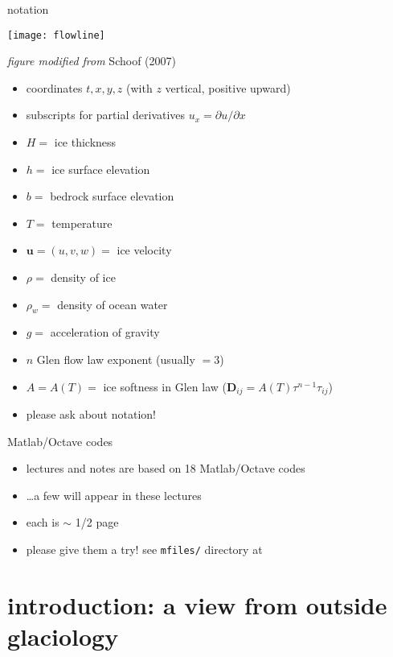 \begin{frame}{notation} 

\begin{center}
  \texttt{[image: flowline]}

\tiny \emph{figure modified from} Schoof (2007)
\end{center}

\scriptsize
  \begin{itemize}
  \item coordinates $t,x,y,z$  (with $z$ vertical, positive upward)
  \item subscripts for partial derivatives $u_x = \partial u/\partial x$
  \item $H=$ ice thickness
  \item $h=$ ice surface elevation
  \item $b=$ bedrock surface elevation
  \item $T=$ temperature
  \item $\mathbf{u}=(u,v,w)=$ ice velocity
  \item $\rho=$ density of ice
  \item $\rho_w=$ density of ocean water
  \item $g=$ acceleration of gravity
  \item $n$ Glen flow law exponent (usually $=3$)
  \item $A=A(T)=$ ice softness in Glen law ($\mathbf{D}_{ij} = A(T) \tau^{n-1} \tau_{ij}$)
  \item \alert{please ask about notation!}
  \end{itemize}

\end{frame}


\begin{frame}{Matlab/Octave codes}

\begin{itemize}
\item lectures and notes are based on 18 Matlab/Octave codes
\item \dots a few will appear in these lectures
\item each is $\sim$ 1/2 page
\item please give them a try! see \texttt{mfiles/} directory at

\bigskip
  \centerline{}
\end{itemize}
\end{frame}


\section[introduction]{introduction: a view from outside glaciology}

